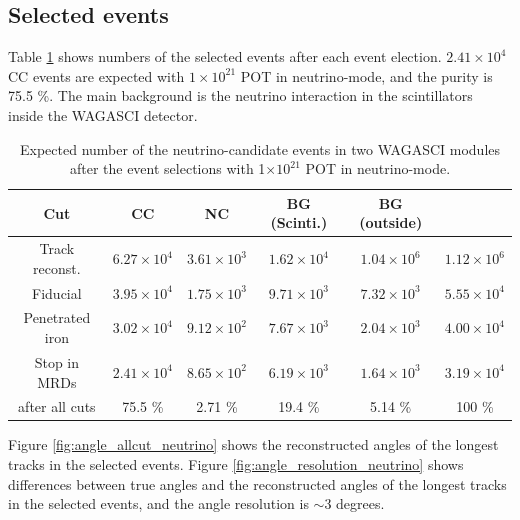 \subsection{Selected events}

Table \ref{tab:expected_num_events_neutrino_beam} shows numbers of the selected events after each event election.
$2.41 \times 10^{4}$ CC events are expected with $1 \times 10^{21}$  POT in neutrino-mode, and the purity is 75.5 \%.
The main background is the neutrino interaction in the scintillators inside the WAGASCI detector.

\begin{table}[htb]
  \begin{center}
    \caption{Expected number of the neutrino-candidate events in two WAGASCI modules after the event selections with 1$\times 10^{21}$ POT in neutrino-mode.}
    \begin{tabular}{c|cccc|c} \hline
      Cut & CC & NC & BG (Scinti.) & BG (outside) \\ \hline
     Track reconst. & $6.27 \times 10^{4}$  & $3.61\times10^{3}$ & $1.62 \times10^{4}$ & $1.04 \times 10^{6}$ & $1.12 \times 10^{6}$ \\
     Fiducial & $3.95 \times 10^{4}$  & $1.75 \times10^{3}$ & $9.71 \times10^{3}$ & $7.32 \times 10^{3}$ & $5.55 \times 10^{4}$ \\
     Penetrated iron & $3.02 \times 10^{4}$  & $9.12 \times10^{2}$ & $7.67 \times10^{3}$ & $2.04 \times 10^{3}$ & $4.00 \times 10^{4}$ \\
     Stop in MRDs & $2.41 \times 10^{4}$  & $8.65 \times10^{2}$ & $6.19 \times10^{3}$ & $1.64 \times 10^{3}$ & $3.19 \times 10^{4}$ \\ \hline
     after all cuts & 75.5 \% & 2.71 \% & 19.4 \% & 5.14 \% & 100 \% \\
     \hline
    \end{tabular}
    \label{tab:expected_num_events_neutrino_beam}
  \end{center}
\end{table}


Figure \ref{fig:angle_allcut_neutrino} shows the reconstructed angles of the longest tracks in the selected events.
Figure \ref{fig:angle_resolution_neutrino} shows differences between true angles and the reconstructed angles of the longest tracks in the selected events, and the angle resolution is $\sim$3 degrees.

